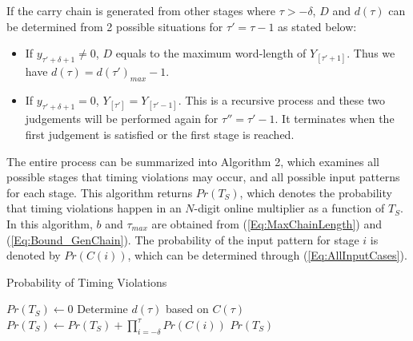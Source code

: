 \documentclass{acm_proc_article-sp}
\begin{document}
If the carry chain is generated from other stages where $\tau>-\delta$, $D$ and $d(\tau)$ can be determined from 2 possible situations for $\tau'=\tau-1$ as stated below:
\vspace{-2.5ex}
\begin{itemize}
  \item If $y_{\tau'+\delta+1}\neq0$, $D$ equals to the maximum word-length of $Y_{[\tau'+1]}$. Thus we have $d(\tau)=d(\tau')_{max}-1$.\vspace{-1ex}
  \item If $y_{\tau'+\delta+1}=0$, $Y_{[\tau']}=Y_{[\tau'-1]}$. This is a recursive process and these two judgements will be performed again for $\tau''=\tau'-1$. It terminates when the first judgement is satisfied or the first stage is reached.
\end{itemize}
\vspace{-1.5ex}

The entire process can be summarized into Algorithm 2, which examines all possible stages that timing violations may occur, and all possible input patterns for each stage. This algorithm returns $Pr(T_S)$, which denotes the probability that timing violations happen in an $N$-digit online multiplier as a function of $T_S$. In this algorithm, $b$ and $\tau_{max}$ are obtained from (\ref{Eq:MaxChainLength}) and (\ref{Eq:Bound_GenChain}). The probability of the input pattern for stage $i$ is denoted by $Pr(C(i))$, which can be determined through (\ref{Eq:AllInputCases}).
%
\begin{algorithm}[htbp]
  \caption{Probability of Timing Violations}
  \begin{algorithmic}[1]
    \STATE  $Pr(T_S)\leftarrow0$
    \STATE  Determine $d(\tau)$ based on $C(\tau)$
    \STATE  $Pr(T_S)\leftarrow Pr(T_S)+\prod_{i=-\delta}^{\tau}Pr(C(i))$
    \ENDIF
    \ENDFOR
    \RETURN $Pr(T_S)$
  \label{Algorithm:ProbabilityTimingViolation}
  \end{algorithmic}
\end{algorithm}
\end{document}
